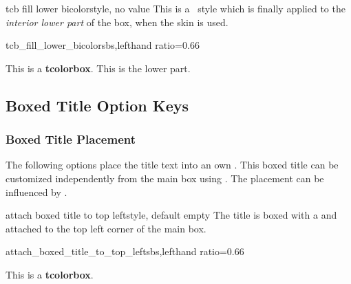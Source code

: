 \clearpage

\begin{docTikzKey}[][doc new=2025-07-07]{tcb fill lower bicolor}{}{style, no value}
This is a \tikzname\ style which is finally applied to the
\emph{interior lower part} of the box, when the  skin is used.

\begin{exdispExample*}{tcb_fill_lower_bicolor}{sbs,lefthand ratio=0.66}

\begin{tcolorbox}[title=My title]
This is a \textbf{tcolorbox}.
\tcblower
This is the lower part.
\end{tcolorbox}
\end{exdispExample*}
\end{docTikzKey}



\clearpage
\subsection{Boxed Title Option Keys}\label{subsec:skinboxedtitle}

\subsubsection{Boxed Title Placement}
The following options place the title text into an own .
This boxed title can be customized independently from the main box using
.
The placement can be influenced by .

\begin{docTcbKey}{attach boxed title to top left}{}{style, default empty}
The title is boxed with a  and attached to
the top left corner of the main box.
\begin{exdispExample*}{attach_boxed_title_to_top_left}{sbs,lefthand ratio=0.66}
\begin{tcolorbox}[enhanced,title=My title,
  attach boxed title to top left]
  This is a \textbf{tcolorbox}.
\end{tcolorbox}
\end{exdispExample*}
\end{docTcbKey}

